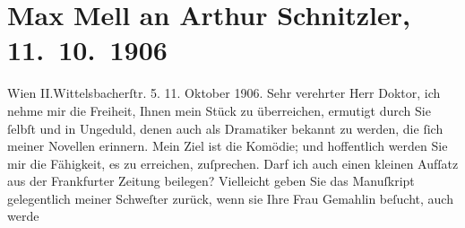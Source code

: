 

         
         \renewcommand{\erwaehntePersonen}{Personen: Josef Kainz, Max Mell, Maria Mell, Olga Schnitzler}
         \renewcommand{\erwaehnteInstitutionen}{Institutionen: Frankfurter Zeitung}
         \renewcommand{\erwaehnteOrte}{Orte: Berlin, II., Leopoldstadt, Wien, Wittelsbachstraße}
         \renewcommand{\erwaehnteWerke}{Werke: Die Komödianten, Über die Briefe Beethovens}
               \section[Max Mell an Arthur Schnitzler, 11. 10. 1906]{ Max Mell an Arthur Schnitzler, 11. 10. 1906}\nopagebreak{}\rehead{ }\begin{ledgroupsized}[t]{13cm}\normalsize\beginnumbering \toendnotes[C]{\smallbreak\pagebreak[2]} 
\toendnotes[C]{\smallbreak}\pstart
           \noindent{}\raggedleft{}{\pb}Wien II.Wittelsbacherſtr. 5.\pend
           \pstart
           \raggedleft{}11. Oktober 1906.\pend
           \pstart{}Sehr verehrter Herr Doktor,\pend\pstart
           ich nehme mir die Freiheit, Ihnen mein Stück zu überreichen, ermutigt durch Sie ſelbſt und in
               Ungeduld, denen auch als Dramatiker bekannt zu werden, die ſich meiner Novellen
               erinnern. Mein Ziel ist die Komödie; und hoffentlich werden Sie mir die Fähigkeit, es
               zu erreichen, zuſprechen.\pend
           \pstart
           Darf ich auch einen kleinen Aufſatz aus der Frankfurter Zeitung
               beilegen?\pend
           \pstart
           Vielleicht geben Sie das Manuſkript gelegentlich meiner Schweſter zurück, wenn sie Ihre Frau Gemahlin beſucht, auch werde

\end{ledgroupsized}
